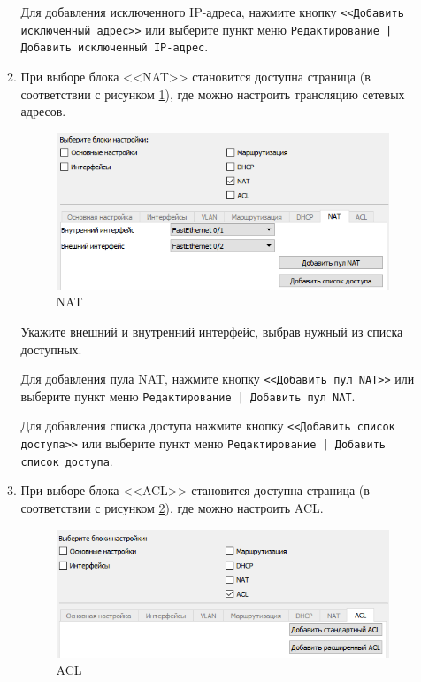 \begin{enumerate}
\begin{enumerate}
 Для добавления исключенного IP-адреса, нажмите кнопку \texttt{<<Добавить исключенный адрес>>} или выберите пункт меню \texttt{Редактирование | Добавить исключенный IP-адрес}.

\item 
При выборе блока <<NAT>> становится доступна страница (в соответствии с рисунком \ref{fig:nat_settings}), где можно настроить трансляцию сетевых адресов.

\begin{figure}[th!]
	\centering
	\includegraphics[width=1\linewidth]{pic/nat_settings}
	\caption{NAT}
	\label{fig:nat_settings}
\end{figure}

Укажите внешний и внутренний интерфейс, выбрав нужный из списка доступных.

Для добавления пула NAT, нажмите кнопку \texttt{<<Добавить пул NAT>>} или выберите пункт меню \texttt{Редактирование | Добавить пул NAT}.

Для добавления списка доступа нажмите кнопку \texttt{<<Добавить список доступа>>} или выберите пункт меню \texttt{Редактирование | Добавить список доступа}.

\item 
При выборе блока <<ACL>> становится доступна страница (в соответствии с рисунком \ref{fig:acl_settings}), где можно настроить ACL.

\begin{figure}[th!]
	\centering
	\includegraphics[width=1\linewidth]{pic/acl_settings}
	\caption{ACL}
	\label{fig:acl_settings}
\end{figure}


\end{enumerate}
\end{enumerate}
